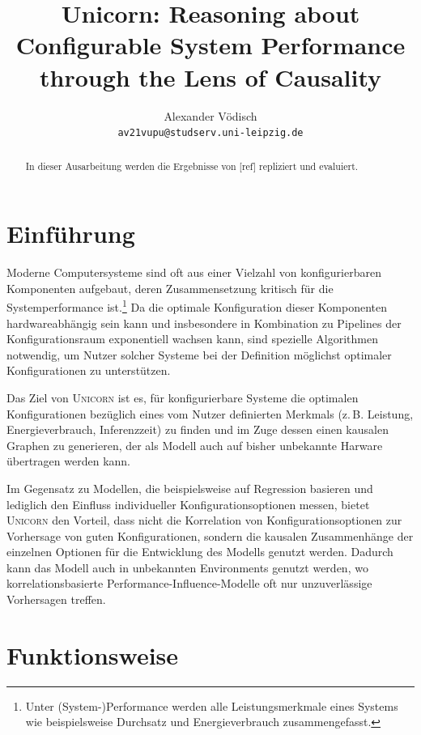 \documentclass[11pt]{article}
\title{Unicorn: Reasoning about Configurable System Performance through the Lens of Causality \\[16px] \normalfont{Reproduktion und Evaluation}}
\author{
  Alexander Vödisch \\
  \texttt{av21vupu@studserv.uni-leipzig.de} \\
}
\begin{document}
\maketitle

\begin{abstract}
In dieser Ausarbeitung werden die Ergebnisse von [ref] repliziert und evaluiert.
\end{abstract}

\section{Einführung}

Moderne Computersysteme sind oft aus einer Vielzahl von konfigurierbaren Komponenten aufgebaut, deren Zusammensetzung kritisch für die Systemperformance ist.\footnote{Unter (System-)Performance werden alle Leistungsmerkmale eines Systems wie beispielsweise Durchsatz und Energieverbrauch zusammengefasst.} Da die optimale Konfiguration dieser Komponenten hardwareabhängig sein kann und insbesondere in Kombination zu Pipelines der Konfigurationsraum exponentiell wachsen kann, sind spezielle Algorithmen notwendig, um Nutzer solcher Systeme bei der Definition möglichst optimaler Konfigurationen zu unterstützen.

Das Ziel von \textsc{Unicorn} ist es, für konfigurierbare Systeme die optimalen Konfigurationen bezüglich eines vom Nutzer definierten Merkmals (z.\,B. Leistung, Energieverbrauch, Inferenzzeit) zu finden und im Zuge dessen einen kausalen Graphen zu generieren, der als Modell auch auf bisher unbekannte Harware übertragen werden kann.

Im Gegensatz zu Modellen, die beispielsweise auf Regression basieren und lediglich den Einfluss individueller Konfigurationsoptionen messen, bietet \textsc{Unicorn} den Vorteil, dass nicht die Korrelation von Konfigurationsoptionen zur Vorhersage von guten Konfigurationen, sondern die kausalen Zusammenhänge der einzelnen Optionen für die Entwicklung des Modells genutzt werden. Dadurch kann das Modell auch in unbekannten Environments genutzt werden, wo korrelationsbasierte Performance-Influence-Modelle oft nur unzuverlässige Vorhersagen treffen.

\section{Funktionsweise}
\end{document}
